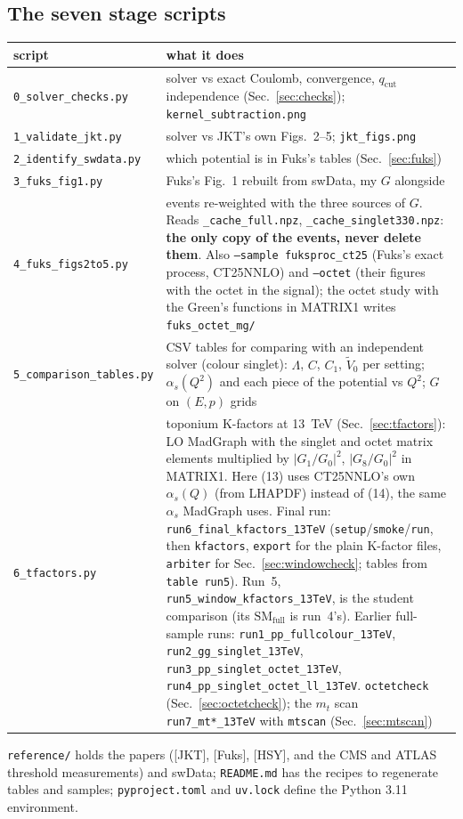 \documentclass[11pt]{article}
\newcommand{\code}[1]{\texttt{#1}}
\newcommand{\JKT}{[JKT]}
\newcommand{\Fuks}{[Fuks]}
\newcommand{\HSY}{[HSY]}
\newcommand{\qc}{q_\mathrm{cut}}
\newcommand{\SMfull}{\mathrm{SM}_\mathrm{full}}
\begin{document}
\subsection*{The seven stage scripts}
{\small\noindent\begin{tabularx}{\linewidth}{@{}lL@{}}
\toprule
script & what it does \\
\midrule
\code{0\_solver\_checks.py} & solver vs exact Coulomb, convergence, $\qc$ independence (Sec.~\ref{sec:checks}); \code{kernel\_subtraction.png}\\
\code{1\_validate\_jkt.py} & solver vs JKT's own Figs.~2--5; \code{jkt\_figs.png}\\
\code{2\_identify\_swdata.py} & which potential is in Fuks's tables (Sec.~\ref{sec:fuks})\\
\code{3\_fuks\_fig1.py} & Fuks's Fig.~1 rebuilt from swData, my $G$ alongside\\
\code{4\_fuks\_figs2to5.py} & events re-weighted with the three sources of $G$. Reads \code{\_cache\_full.npz},
  \code{\_cache\_singlet330.npz}: \textbf{the only copy of the events, never delete them}. Also
  \code{--sample fuksproc\_ct25} (Fuks's exact process, CT25NNLO) and \code{--octet} (their figures with the octet in the signal);
  the octet study with the Green's functions in MATRIX1 writes \code{fuks\_octet\_mg/}\\
\code{5\_comparison\_tables.py} & CSV tables for comparing with an independent solver (colour singlet): $\Lambda$, $C$, $C_1$,
  $\tilde V_0$ per setting; $\alpha_s(Q^2)$ and each piece of the potential vs $Q^2$; $G$ on $(E,p)$ grids\\
\code{6\_tfactors.py} & toponium K-factors at 13~TeV (Sec.~\ref{sec:tfactors}): LO MadGraph with the singlet and octet
  matrix elements multiplied by $|G_1/G_0|^2$, $|G_8/G_0|^2$ in MATRIX1. Here (13) uses CT25NNLO's own $\alpha_s(Q)$ (from LHAPDF)
  instead of (14), the same $\alpha_s$ MadGraph uses. Final run: \code{run6\_final\_kfactors\_13TeV} (\code{setup}/\code{smoke}/\code{run},
  then \code{kfactors}, \code{export} for the plain K-factor files, \code{arbiter} for Sec.~\ref{sec:windowcheck}; tables from
  \code{table run5}). Run~5, \code{run5\_window\_kfactors\_13TeV}, is the student comparison (its $\SMfull$ is run~4's).
  Earlier full-sample runs: \code{run1\_pp\_fullcolour\_13TeV}, \code{run2\_gg\_singlet\_13TeV},
  \code{run3\_pp\_singlet\_octet\_13TeV}, \code{run4\_pp\_singlet\_octet\_ll\_13TeV}. \code{octetcheck} (Sec.~\ref{sec:octetcheck});
  the $m_t$ scan \code{run7\_mt*\_13TeV} with \code{mtscan} (Sec.~\ref{sec:mtscan})\\
\bottomrule
\end{tabularx}}

\medskip
\noindent \code{reference/} holds the papers (\JKT, \Fuks, \HSY, and the CMS and ATLAS threshold measurements) and swData; \code{README.md} has the recipes to regenerate tables and samples;
\code{pyproject.toml} and \code{uv.lock} define the Python 3.11 environment.
\endgroup
\end{document}
